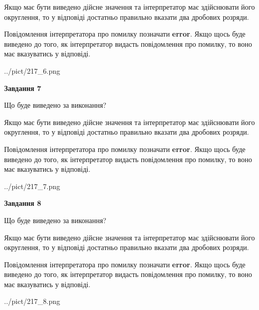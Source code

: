 \documentclass[12pt, ukrainian]{article}
\begin{document}
{\begin {Large}
Якщо має бути виведено дійсне значення та інтерпретатор має здійснювати його округлення, 
то у відповіді достатньо правильно вказати два дробових розряди.

Повідомлення інтерпретатора про помилку позначати \textbf{error}.
Якщо щось буде виведено до того, як інтерпретатор видасть повідомлення про помилку, 
то воно має вказуватись у відповіді. \par

\begin{center}
	{../pict/217_6.png}
\end{center}
\newpage

{\begin {center}\textbf{Завдання 7}\end {center}}\par
Що буде виведено за виконання? \par

Якщо має бути виведено дійсне значення та інтерпретатор має здійснювати його округлення, 
то у відповіді достатньо правильно вказати два дробових розряди.

Повідомлення інтерпретатора про помилку позначати \textbf{error}.
Якщо щось буде виведено до того, як інтерпретатор видасть повідомлення про помилку, 
то воно має вказуватись у відповіді. \par

\begin{center}
	{../pict/217_7.png}
\end{center}
\newpage

{\begin {center}\textbf{Завдання 8}\end {center}}\par
Що буде виведено за виконання? \par

Якщо має бути виведено дійсне значення та інтерпретатор має здійснювати його округлення, 
то у відповіді достатньо правильно вказати два дробових розряди.

Повідомлення інтерпретатора про помилку позначати \textbf{error}.
Якщо щось буде виведено до того, як інтерпретатор видасть повідомлення про помилку, 
то воно має вказуватись у відповіді. \par

\begin{center}
	{../pict/217_8.png}
\end{center}
\newpage


\end{Large}}
\end{document}
